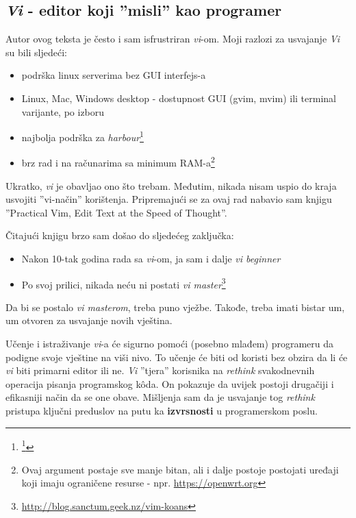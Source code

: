 \documentclass[times, utf8, seminar]{fit}
\begin{document}
\subsection{\emph{Vi} - editor koji ''misli'' kao programer}

\label{sec:vimaster}

Autor ovog teksta je često i sam isfrustriran \emph{vi}-om. Moji razlozi za usvajanje \emph{Vi} su bili sljedeći:
\begin{itemize}
 \item podrška linux serverima bez GUI interfejs-a
 \item Linux, Mac, Windows desktop - dostupnost GUI (gvim, mvim) ili terminal varijante, po izboru 
 \item najbolja podrška za \emph{harbour}\footnote{\footnote{http://en.wikipedia.org/wiki/Harbour_(software)}}
 \item brz rad i na računarima sa minimum RAM-a\footnote{Ovaj argument postaje sve manje bitan, ali i dalje postoje postojati uređaji koji imaju ograničene resurse - npr. \url{https://openwrt.org}}
\end{itemize}

Ukratko, \emph{vi} je obavljao ono što trebam. Međutim, nikada nisam uspio do kraja usvojiti ''vi-način'' korištenja. Pripremajući se za ovaj rad nabavio sam knjigu ''Practical Vim, Edit Text at the Speed of Thought''\citep{pragvim}.

Čitajući knjigu brzo sam došao do sljedećeg zaključka:
\begin{itemize}
  \item Nakon 10-tak godina rada sa \emph{vi}-om, ja sam i dalje \emph{vi beginner} 
  \item Po svoj prilici, nikada neću ni postati \emph{vi master}\footnote{\url{http://blog.sanctum.geek.nz/vim-koans}}
\end{itemize}

Da bi se postalo \emph{vi masterom}, treba puno vježbe. Takođe, treba imati bistar um, um otvoren za usvajanje novih vještina. 

Učenje i istraživanje \emph{vi}-a će sigurno pomoći (posebno mlađem) programeru da podigne svoje vještine na viši nivo. To učenje će biti od koristi bez obzira da li će \emph{vi} biti primarni editor ili ne. \emph{Vi} ''tjera'' korisnika na \emph{rethink} svakodnevnih operacija pisanja programskog k\^oda. On pokazuje da uvijek postoji drugačiji i efikasniji način da se one obave. Mišljenja sam da je usvajanje tog \emph{rethink} pristupa ključni preduslov na putu ka \textbf{izvrsnosti} u programerskom poslu.
\end{document}
